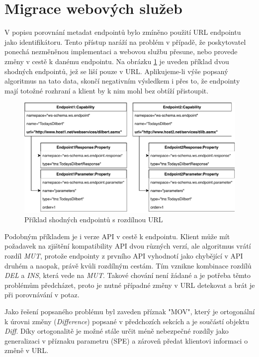 \documentclass[czech,DP]{thesiskiv}
\begin{document}
\section{Migrace webových služeb}	
\label{subsec:mov}
V popisu porovnání metadat endpointů bylo zmíněno použití URL endpointu jako identifikátoru. Tento přístup naráží na problém v případě, že poskytovatel ponechá nezměněnou implementaci a webovou službu přesune, nebo provede změny v cestě k danému endpointu. Na obrázku \ref{fig:mov-example} je uveden příklad dvou shodných endpointů, jež se liší pouze v URL. Aplikujeme-li výše popsaný algoritmus na tato data, skončí negativním výsledkem i přes to, že endpointy mají totožné rozhraní a klient by k nim mohl bez obtíží přistoupit. 

\begin{figure}[h]
	\centering
	\includegraphics[width=\linewidth]{same-end-diff-url}
	\caption{Příklad shodných endpointů s rozdílnou URL}
	\label{fig:mov-example}
\end{figure}

Podobným příkladem je i verze API v cestě k endpointu. Klient může mít požadavek na zjištění kompatibility API dvou různých verzí, ale algoritmus vrátí rozdíl \textit{MUT}, protože endpointy z prvního API vyhodnotí jako chybějící v API druhém a naopak, právě kvůli rozdílným cestám. Tím vznikne kombinace rozdílů \textit{DEL} a \textit{INS}, která vede na \textit{MUT}. Takové chování není žádané a je potřeba těmto problémům předcházet, proto je nutné případné změny v URL detekovat a brát je při porovnávání v potaz.

Jako řešení popsaného problému byl zaveden příznak "MOV", který je ortogonální k úrovni změny (\textit{Difference}) popsané v předchozích sekcích a je součástí objektu \textit{Diff}. Díky ortogonalitě je možné stále určit méně nebezpečné rozdíly jako generalizaci v příznaku parametru (SPE) a zároveň předat klientovi informaci o změně v URL. 
\end{document}
